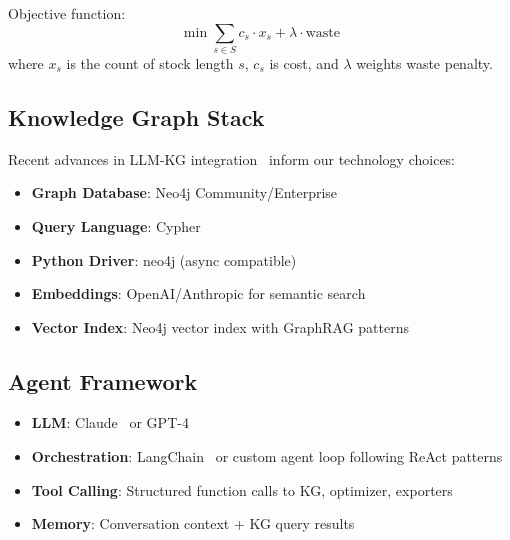 Objective function:
\begin{equation}
\min \sum_{s \in S} c_s \cdot x_s + \lambda \cdot \text{waste}
\end{equation}
where $x_s$ is the count of stock length $s$, $c_s$ is cost, and $\lambda$ weights waste penalty.

\subsection{Knowledge Graph Stack}

Recent advances in LLM-KG integration~\cite{zhu2024llm_kg_construction} inform our technology choices:
\begin{itemize}
  \item \textbf{Graph Database}: Neo4j Community/Enterprise
  \item \textbf{Query Language}: Cypher
  \item \textbf{Python Driver}: neo4j (async compatible)
  \item \textbf{Embeddings}: OpenAI/Anthropic for semantic search
  \item \textbf{Vector Index}: Neo4j vector index with GraphRAG patterns~\cite{edge2024graphrag}
\end{itemize}

\subsection{Agent Framework}

\begin{itemize}
  \item \textbf{LLM}: Claude~\cite{anthropic2024claude} or GPT-4~\cite{openai2024gpt4}
  \item \textbf{Orchestration}: LangChain~\cite{chase2022langchain} or custom agent loop following ReAct patterns~\cite{yao2023react}
  \item \textbf{Tool Calling}: Structured function calls to KG, optimizer, exporters~\cite{schick2023toolformer}
  \item \textbf{Memory}: Conversation context + KG query results
\end{itemize}
